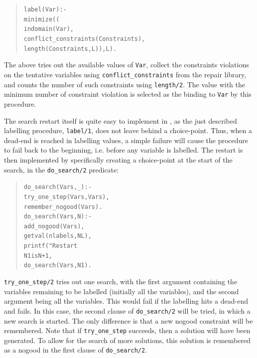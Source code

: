 \begin{quote}\begin{alltt}
label(Var) :-
       minimize((
             indomain(Var),
             conflict_constraints(Constraints),
             length(Constraints, L) ), L).
\end{alltt}\end{quote}

The above tries out the available values of \verb'Var', collect the
constraints violations on the tentative variables using
\verb'conflict_constraints' from the repair library, and counts the number
of such constraints using \verb'length/2'. The value with the minimum
number of constraint violation is selected as the binding to \verb'Var' by
this procedure.

The search restart itself is quite easy to implement in {\eclipse}, as the
just described labelling procedure, \verb'label/1', does not leave behind a
choice-point. Thus, when a dead-end is reached in labelling values, a
simple failure will cause the procedure to fail back to the beginning,
i.e. before any variable is labelled. The restart is then implemented by
specifically creating a choice-point at the start of the search, in the
\verb'do_search/2' predicate:

\begin{quote}\begin{alltt}
do_search(Vars, _) :-
        try_one_step(Vars, Vars),
        remember_nogood(Vars).
do_search(Vars, N) :- 
        add_nogood(Vars),  %
        getval(nlabels, NL),
        printf("Restart %
        N1 is N + 1,
        do_search(Vars, N1).
\end{alltt}\end{quote}

\noindent
\verb'try_one_step/2' tries out one search, with the first argument
containing the variables remaining to be labelled (initially all the
variables), and the second argument being all the variables. This would
fail if the labelling hits a dead-end and fails. In this case, the second
clause of \verb'do_search/2' will be tried, in which a new search is
started. The only difference is that a new nogood constraint will be
remembered. Note that if \verb'try_one_step' succeeds, then a solution will
have been generated. To allow for the search of more solutions, this
solution is remembered as a nogood in the first clause of
\verb'do_search/2'. 

